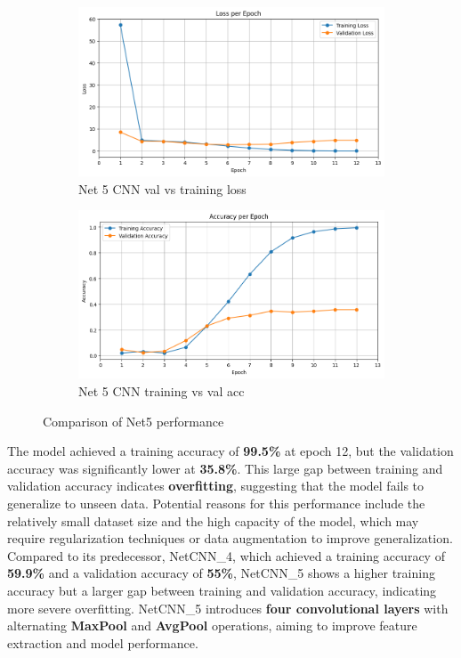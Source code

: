\documentclass[12pt]{article}
\begin{document}
\begin{figure}[ht]
    \centering
    \begin{subfigure}{0.45\linewidth}
        \centering
        \includegraphics[width=\linewidth]{net5_loss.png}
        \caption{Net 5 CNN val vs training loss}
        \label{fig:net5_loss}
    \end{subfigure}
    \hfill
    \begin{subfigure}{0.45\linewidth}
        \centering
        \includegraphics[width=\linewidth]{net5_acc.png}
        \caption{Net 5 CNN training vs val acc}
        \label{fig:net5_acc}
    \end{subfigure}
    \caption{Comparison of Net5 performance}
    \label{fig:net5_performance}
\end{figure}

The model achieved a training accuracy of \textbf{99.5\%} at epoch 12, but the validation accuracy was significantly lower at \textbf{35.8\%}. This large gap between training and validation accuracy indicates \textbf{overfitting}, suggesting that the model fails to generalize to unseen data. Potential reasons for this performance include the relatively small dataset size and the high capacity of the model, which may require regularization techniques or data augmentation to improve generalization. Compared to its predecessor, NetCNN\_4, which achieved a training accuracy of \textbf{59.9\%} and a validation accuracy of \textbf{55\%}, NetCNN\_5 shows a higher training accuracy but a larger gap between training and validation accuracy, indicating more severe overfitting. NetCNN\_5 introduces \textbf{four convolutional layers} with alternating \textbf{MaxPool} and \textbf{AvgPool} operations, aiming to improve feature extraction and model performance.
\end{document}

